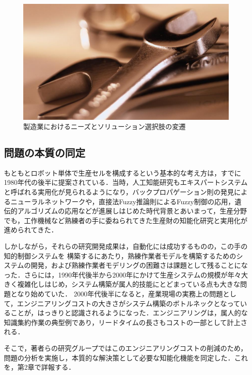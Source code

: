 \begin{figure}[b]\centering \includegraphics[width=12cm]{Fig/ChangesInManufacturing.pdf}
\caption{製造業におけるニーズとソリューション選択肢の変遷}\label{fig:ChangesInManufacturing}\end{figure}


\subsection{問題の本質の同定}

もともとロボット単体で生産セルを構成するという基本的な考え方は，すでに1980年代の後半に提案されている\cite{Zupancic1988}．当時，人工知能研究もエキスパートシステムと呼ばれる実用化が見られるようになり，バックプロパゲーション則の発見によるニューラルネットワークや，直接法Fuzzy推論則によるFuzzy制御の応用，遺伝的アルゴリズムの応用などが進展しはじめた時代背景とあいまって，生産分野でも，工作機械など熟練者の手に委ねられてきた生産財の知能化研究と実用化が進められてきた．

しかしながら，それらの研究開発成果は，自動化には成功するものの，この手の知的制御システムを
構築するにあたり，熟練作業者モデルを構築するためのシステムの開発，および熟練作業者モデリングの困難さは課題として残ることになった．さらには，1990年代後半から2000年にかけて生産システムの規模が年々大きく複雑化しはじめ，システム構築が属人的技能にとどまっている点も大きな問題となり始めていた\cite{Noda2004}．
2000年代後半になると，産業現場の実務上の問題として，エンジニアリングコストの大きさがシステム構築のボトルネックとなっていることが，はっきりと認識されるようになった．エンジニアリングは，属人的な知識集約作業の典型例であり，リードタイムの長さもコストの一部として計上される．

そこで，著者らの研究グループではこのエンジニアリングコストの削減のため，問題の分析を実施し，本質的な解決策として必要な知能化機能を同定した．これを，第2章で詳報する．

